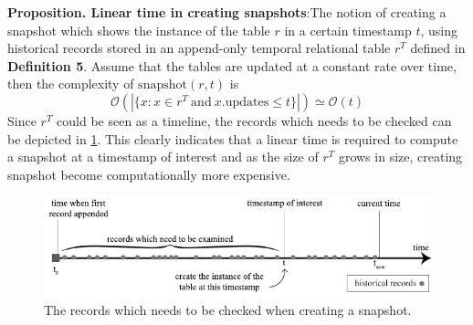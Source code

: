 \textbf{Proposition. Linear time in creating snapshots}:The notion of creating a snapshot which shows the instance of the table $r$ in a certain timestamp $t$, using historical records stored in an append-only temporal relational table $r^T$ defined in \textbf{Definition 5}. Assume that the tables are updated at a constant rate over time, then the complexity of $\mathrm{snapshot}(r, t)$ is $$\mathcal{O}(|\{x: x\in r^T\mathrm{\ and\ } x.\mathrm{updates} \leq t\}|)\simeq \mathcal{O}(t)$$
Since $r^T$ could be seen as a timeline, the records which needs to be checked can be depicted in \ref{fig:checked_records}. This clearly indicates that a linear time is required to compute a snapshot at a timestamp of interest and as the size of $r^T$ grows in size, creating snapshot become computationally more expensive.

\begin{figure}[b]
	\centering
	\includegraphics[width=\textwidth]{figs/tobechecked_records.pdf}
	\caption{The records which needs to be checked when creating a snapshot.}
	\label{fig:checked_records}
\end{figure}

